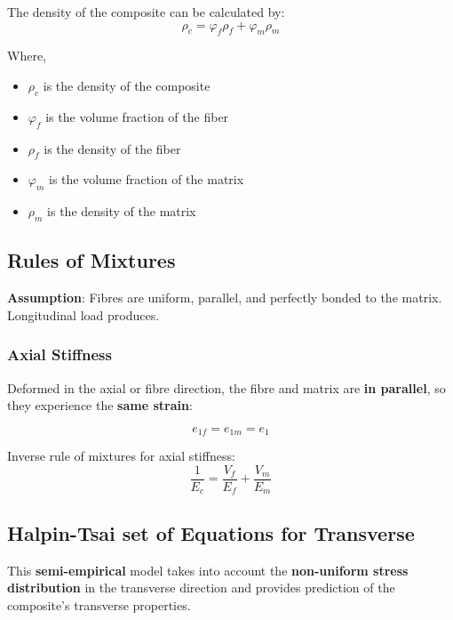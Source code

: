 \documentclass{NoteThesis/note-thesis}
\begin{document}
The density of the composite can be calculated by:
\begin{equation*}
    \rho_c = \varphi_f \rho_f + \varphi_m \rho_m
\end{equation*}

Where,
\begin{itemize}
    \item $\rho_c$ is the density of the composite
    \item $\varphi_f$ is the volume fraction of the fiber
    \item $\rho_f$ is the density of the fiber
    \item $\varphi_m$ is the volume fraction of the matrix
    \item $\rho_m$ is the density of the matrix
\end{itemize}

\subsection{Rules of Mixtures}

\textbf{Assumption}: Fibres are uniform, parallel, and perfectly bonded to the matrix. Longitudinal load produces.

\subsubsection*{Axial Stiffness}

Deformed in the axial or fibre direction, the fibre and matrix are \textbf{in parallel}, so they experience the \textbf{same strain}:

\begin{equation*}
    e_{1f} = e_{1m} = e_1
\end{equation*}

Inverse rule of mixtures for axial stiffness:
\begin{equation*}
    \frac{1}{E_c} = \frac{V_f}{E_f} + \frac{V_m}{E_m}
\end{equation*}

\subsection{Halpin-Tsai set of Equations for Transverse}

This \textbf{semi-empirical} model takes into account the \textbf{non-uniform stress distribution} in the transverse direction and provides prediction of the composite's transverse properties.
\end{document}
